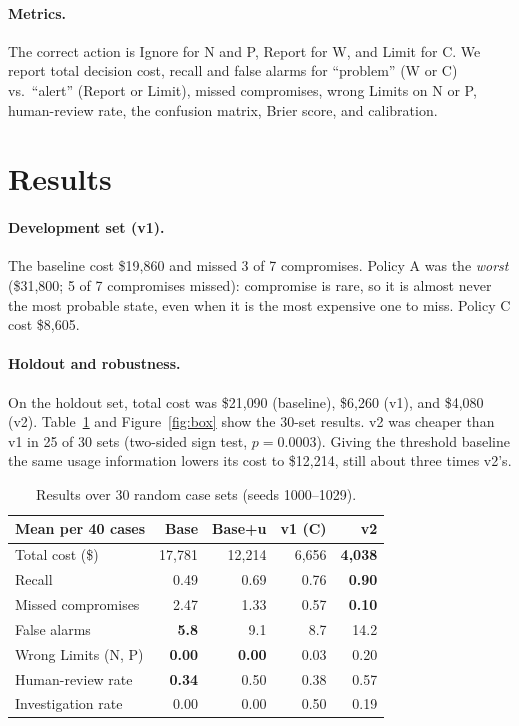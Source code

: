 \documentclass{article}
\begin{document}
\paragraph{Metrics.} The correct action is Ignore for N and P, Report for W, and Limit for C. We report total decision cost, recall and false alarms for ``problem'' (W or C) vs.\ ``alert'' (Report or Limit), missed compromises, wrong Limits on N or P, human-review rate, the confusion matrix, Brier score, and calibration.

\section{Results}
\label{sec:results}

\paragraph{Development set (v1).} The baseline cost \$19{,}860 and missed 3 of 7 compromises. Policy A was the \emph{worst} (\$31{,}800; 5 of 7 compromises missed): compromise is rare, so it is almost never the most probable state, even when it is the most expensive one to miss. Policy C cost \$8{,}605.

\paragraph{Holdout and robustness.} On the holdout set, total cost was \$21{,}090 (baseline), \$6{,}260 (v1), and \$4{,}080 (v2). Table~\ref{tab:main} and Figure~\ref{fig:box} show the 30-set results. v2 was cheaper than v1 in 25 of 30 sets (two-sided sign test, $p = 0.0003$). Giving the threshold baseline the same usage information lowers its cost to \$12{,}214, still about three times v2's.

\begin{table}[t]
\centering
\small
\setlength{\tabcolsep}{4pt}
\begin{tabular}{lrrrr}
\toprule
Mean per 40 cases & Base & Base+u & v1 (C) & v2 \\
\midrule
Total cost (\$) & 17{,}781 & 12{,}214 & 6{,}656 & \textbf{4{,}038} \\
Recall & 0.49 & 0.69 & 0.76 & \textbf{0.90} \\
Missed compromises & 2.47 & 1.33 & 0.57 & \textbf{0.10} \\
False alarms & \textbf{5.8} & 9.1 & 8.7 & 14.2 \\
Wrong Limits (N, P) & \textbf{0.00} & \textbf{0.00} & 0.03 & 0.20 \\
Human-review rate & \textbf{0.34} & 0.50 & 0.38 & 0.57 \\
Investigation rate & 0.00 & 0.00 & 0.50 & 0.19 \\
\bottomrule
\end{tabular}
\caption{Results over 30 random case sets (seeds 1000--1029).}
\label{tab:main}
\end{table}
\end{document}
